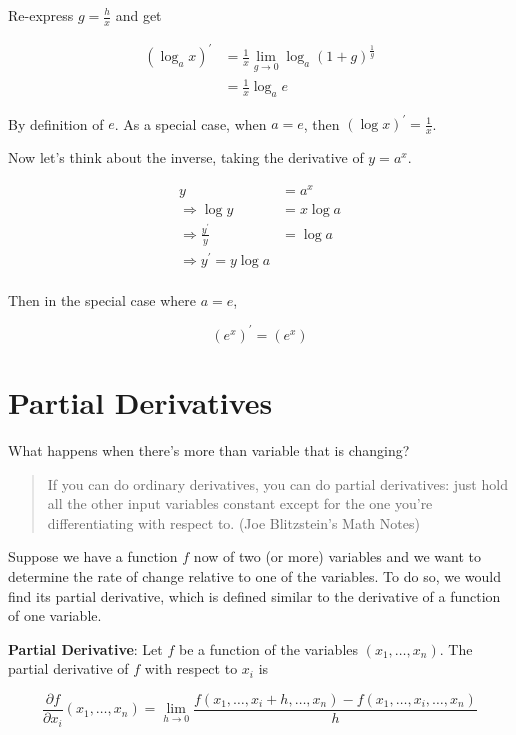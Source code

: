 \documentclass[]{book}
\theoremstyle{definition}
\theoremstyle{definition}
\theoremstyle{definition}
\theoremstyle{remark}
\begin{document}
Re-express \(g = \frac{h}{x}\) and get

\begin{align*}
(\log_a x)^\prime &= \frac{1}{x}\lim_{g\to 0}\log_{a} (1 + g)^{\frac{1}{g}}\\
&= \frac{1}{x}\log_a e
\end{align*}

By definition of \(e\). As a special case, when \(a = e\), then
\((\log x)^\prime = \frac{1}{x}\).

Now let's think about the inverse, taking the derivative of \(y = a^x\).

\begin{align*}
y &= a^x \\
\Rightarrow \log y &= x \log a\\
\Rightarrow \frac{y^\prime}{y} &= \log a\\
\Rightarrow  y^\prime = y \log a\\
\end{align*}

Then in the special case where \(a = e\),

\[(e^x)^\prime = (e^x)\]

\section{Partial Derivatives}\label{partial-derivatives}

What happens when there's more than variable that is changing?

\begin{quote}
If you can do ordinary derivatives, you can do partial derivatives: just
hold all the other input variables constant except for the one you're
differentiating with respect to. (Joe Blitzstein's Math Notes)
\end{quote}

Suppose we have a function \(f\) now of two (or more) variables and we
want to determine the rate of change relative to one of the variables.
To do so, we would find its partial derivative, which is defined similar
to the derivative of a function of one variable.

\textbf{Partial Derivative}: Let \(f\) be a function of the variables
\((x_1,\ldots,x_n)\). The partial derivative of \(f\) with respect to
\(x_i\) is

\[\frac{\partial f}{\partial x_i} (x_1,\ldots,x_n) = \lim\limits_{h\to 0} \frac{f(x_1,\ldots,x_i+h,\ldots,x_n)-f(x_1,\ldots,x_i,\ldots,x_n)}{h}\]
\end{document}
